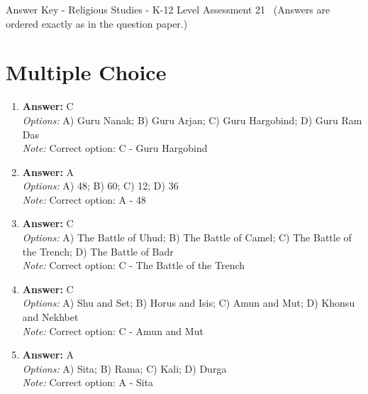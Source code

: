 \documentclass[12pt]{article}
\begin{document}
\begin{center}
Answer Key - Religious Studies - K-12 Level Assessment 21 \
\small (Answers are ordered exactly as in the question paper.)
\end{center}

\section*{Multiple Choice}
\begin{enumerate}[label=\arabic*.]
\item \textbf{Answer:} C
\\ \textit{Options:} A) Guru Nanak; B) Guru Arjan; C) Guru Hargobind; D) Guru Ram Das
\\ \textit{Note:} Correct option: C - Guru Hargobind
\item \textbf{Answer:} A
\\ \textit{Options:} A) 48; B) 60; C) 12; D) 36
\\ \textit{Note:} Correct option: A - 48
\item \textbf{Answer:} C
\\ \textit{Options:} A) The Battle of Uhud; B) The Battle of Camel; C) The Battle of the Trench; D) The Battle of Badr
\\ \textit{Note:} Correct option: C - The Battle of the Trench
\item \textbf{Answer:} C
\\ \textit{Options:} A) Shu and Set; B) Horus and Isis; C) Amun and Mut; D) Khonsu and Nekhbet
\\ \textit{Note:} Correct option: C - Amun and Mut
\item \textbf{Answer:} A
\\ \textit{Options:} A) Sita; B) Rama; C) Kali; D) Durga
\\ \textit{Note:} Correct option: A - Sita
\end{enumerate}
\end{document}
